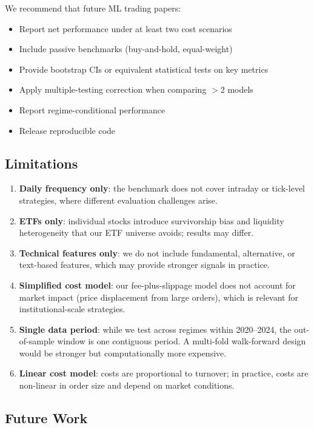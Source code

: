 \documentclass[11pt]{article}
\begin{document}
We recommend that future ML trading papers:
\begin{itemize}[leftmargin=1.4em]
  \item Report net performance under at least two cost scenarios
  \item Include passive benchmarks (buy-and-hold, equal-weight)
  \item Provide bootstrap CIs or equivalent statistical tests on key metrics
  \item Apply multiple-testing correction when comparing $>$2 models
  \item Report regime-conditional performance
  \item Release reproducible code
\end{itemize}

\subsection{Limitations}

\begin{enumerate}[leftmargin=1.6em]
  \item \textbf{Daily frequency only}: the benchmark does not cover intraday or tick-level strategies, where different evaluation challenges arise.
  \item \textbf{ETFs only}: individual stocks introduce survivorship bias and liquidity heterogeneity that our ETF universe avoids; results may differ.
  \item \textbf{Technical features only}: we do not include fundamental, alternative, or text-based features, which may provide stronger signals in practice.
  \item \textbf{Simplified cost model}: our fee-plus-slippage model does not account for market impact (price displacement from large orders), which is relevant for institutional-scale strategies.
  \item \textbf{Single data period}: while we test across regimes within 2020--2024, the out-of-sample window is one contiguous period. A multi-fold walk-forward design would be stronger but computationally more expensive.
  \item \textbf{Linear cost model}: costs are proportional to turnover; in practice, costs are non-linear in order size and depend on market conditions.
\end{enumerate}

\subsection{Future Work}
\end{document}
